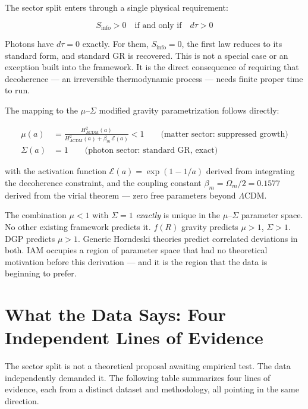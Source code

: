 \documentclass[12pt]{article}
\begin{document}
The sector split enters through a single physical requirement:

\begin{equation}
S_\mathrm{info} > 0 \quad \text{if and only if} \quad d\tau > 0
\end{equation}

Photons have $d\tau = 0$ exactly. For them, $S_\mathrm{info} = 0$, the
first law reduces to its standard form, and standard GR is recovered.
This is not a special case or an exception built into the framework.
It is the direct consequence of requiring that decoherence — an
irreversible thermodynamic process — needs finite proper time to run.

The mapping to the $\mu$--$\Sigma$ modified gravity parametrization
follows directly:

\begin{align}
\mu(a) &= \frac{H^2_{\Lambda\mathrm{CDM}}(a)}{H^2_{\Lambda\mathrm{CDM}}(a)
+ \beta_m\,\mathcal{E}(a)} < 1
\qquad \text{(matter sector: suppressed growth)} \label{eq:mu}\\[6pt]
\Sigma(a) &= 1 \qquad \text{(photon sector: standard GR, exact)} \label{eq:sigma}
\end{align}

with the activation function $\mathcal{E}(a) = \exp(1 - 1/a)$ derived
from integrating the decoherence constraint, and the coupling constant
$\beta_m = \Omega_m/2 = 0.1577$ derived from the virial theorem — zero
free parameters beyond $\Lambda$CDM.

The combination $\mu < 1$ with $\Sigma = 1$ \textit{exactly} is unique
in the $\mu$--$\Sigma$ parameter space. No other existing framework
predicts it. $f(R)$ gravity predicts $\mu > 1$, $\Sigma > 1$. DGP
predicts $\mu > 1$. Generic Horndeski theories predict correlated
deviations in both. IAM occupies a region of parameter space that had
no theoretical motivation before this derivation — and it is the region
that the data is beginning to prefer.


\section{What the Data Says: Four Independent Lines of Evidence}

The sector split is not a theoretical proposal awaiting empirical test.
The data independently demanded it. The following table summarizes four
lines of evidence, each from a distinct dataset and methodology, all
pointing in the same direction.
\end{document}
